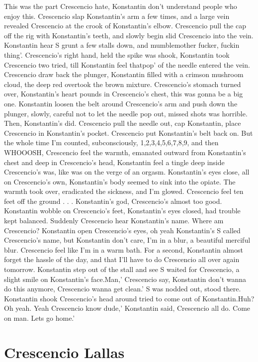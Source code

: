 \documentclass[12pt]{book}
\begin{document}
This was the part Crescencio hate, Konstantin don't understand people who enjoy this. Crescencio slap Konstantin's arm a few times, and a large vein revealed Crescencio at the crook of Konstantin's elbow. Crescencio pull the cap off the rig with Konstantin's teeth, and slowly begin slid Crescencio into the vein. Konstantin hear S grunt a few stalls down, and mumblemother fucker, fuckin thing'. Crescencio's right hand, held the spike was shook, Konstantin took Crescencio two tried, till Konstantin feel thatpop' of the needle entered the vein. Crescencio draw back the plunger, Konstantin filled with a crimson mushroom cloud, the deep red overtook the brown mixture. Crescencio's stomach turned over, Konstantin's heart pounds in Crescencio's chest, this was gonna be a big one. Konstantin loosen the belt around Crescencio's arm and push down the plunger, slowly, careful not to let the needle pop out, missed shots was horrible. Then, Konstantin's did. Crescencio pull the needle out, cap Konstantin, place Crescencio in Konstantin's pocket. Crescencio put Konstantin's belt back on. But the whole time I'm counted, subconsciously, 1,2,3,4,5,6,7,8,9, and then WHOOOSH, Crescencio feel the warmth, emanated outward from Konstantin's chest and deep in Crescencio's head, Konstantin feel a tingle deep inside Crescencio's was, like was on the verge of an orgasm. Konstantin's eyes close, all on Crescencio's own, Konstantin's body seemed to sink into the opiate. The warmth took over, eradicated the sickness, and I'm glowed. Crescencio feel ten feet off the ground . . .  Konstantin's god, Crescencio's almost too good. Konstantin wobble on Crescencio's feet, Konstantin's eyes closed, had trouble kept balanced. Suddenly Crescencio hear Konstantin's name. Where am Crescencio? Konstantin open Crescencio's eyes, oh yeah Konstantin's S called Crescencio's name, but Konstantin don't care, I'm in a blur, a beautiful merciful blur. Crescencio feel like I'm in a warm bath. For a second, Konstantin almost forget the hassle of the day, and that I'll have to do Crescencio all over again tomorrow. Konstantin step out of the stall and see S waited for Crescencio, a slight smile on Konstantin's face.Man,' Crescencio say, Konstantin don't wanna do this anymore, Crescencio wanna get clean.' S was nodded out, stood there. Konstantin shook Crescencio's head around tried to come out of Konstantin.Huh? Oh yeah. Yeah Crescencio know dude,' Konstantin said, Crescencio all do. Come on man. Lets go home.'



\chapter{Crescencio Lallas}
\end{document}
